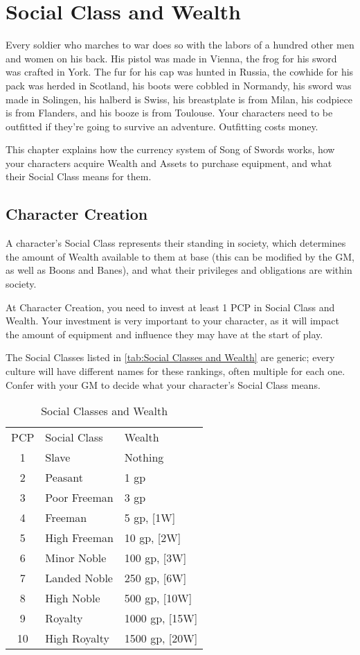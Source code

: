 \documentclass[oneside,11pt,english]{book}
\begin{document}
\chapter{Social Class and Wealth}\label{ch:wealth}
\startcontents[chapters]
\clearpage
Every soldier who marches to war does so with the labors of a hundred other men and women on his back. His pistol was made in Vienna, the frog for his sword was crafted in York. The fur for his cap was hunted in Russia, the cowhide for his pack was herded in Scotland, his boots were cobbled in Normandy, his sword was made in Solingen, his halberd is Swiss, his breastplate is from Milan, his codpiece is from Flanders, and his booze is from Toulouse. Your characters need to be outfitted if they’re going to survive an adventure. Outfitting costs money.

This chapter explains how the currency system of Song of Swords works, how your characters acquire 
Wealth and Assets to purchase equipment, and what their Social Class means for them.
\section{Character Creation}
A character’s Social Class represents their standing in society, which determines the amount of Wealth available to them at base (this can be modified by the GM, as well as Boons and Banes), and what their privileges and obligations are within society.


At Character Creation, you need to invest at least 1 PCP in Social Class and Wealth. Your investment is very important to your character, as it will impact the amount of equipment and influence they may have at the start of play.


The Social Classes listed in \autoref{tab:Social Classes and Wealth} are generic; every culture will have different names for these 
rankings, often multiple for each one. Confer with your GM to decide what your character’s Social Class means.
	\setlength{\intextsep}{0pt}
\begin{wraptable}{r}{7.5 cm} %
	\centering
	\begin{tabu} spread 0pt{cXX}
PCP		&Social Class	&Wealth\\
1		&Slave			&Nothing\\
2		&Peasant		&1 gp\\
3		&Poor Freeman	&3 gp\\
4		&Freeman		&5 gp, [1W]\\
5		&High Freeman	&10 gp, [2W]\\
6		&Minor Noble	&100 gp, [3W]\\
7		&Landed Noble	&250 gp, [6W]\\
8		&High Noble		&500 gp, [10W]\\
9		&Royalty		&1000 gp, [15W]\\
10		&High Royalty	&1500 gp, [20W]\\
	\end{tabu}
	\caption{Social Classes and Wealth}
	\label{tab:Social Classes and Wealth}
\end{wraptable}
	\setlength{\intextsep}{\oldintextsep}
\end{document}
